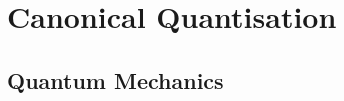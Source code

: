 \documentclass[notes.tex]{subfiles}
\begin{document}
\chapter{Canonical Quantisation}
\label{chap:rqft_canonical-quantisation}
\section{Quantum Mechanics}
\end{document}
